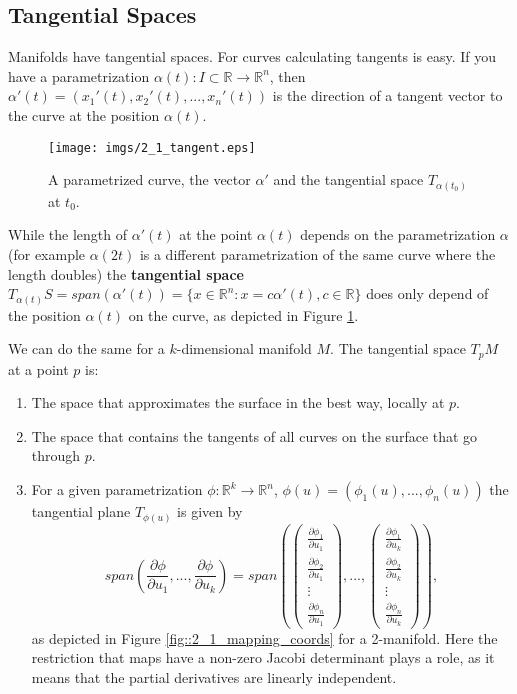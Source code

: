 	
\subsection{Tangential Spaces}		
Manifolds have tangential spaces.
For curves calculating tangents is easy. If you have a parametrization $\alpha(t): I \subset \mathbb R \to \mathbb R^n$, then $\alpha'(t) = (x_1'(t),x_2'(t),...,x_n'(t))$ is the direction of a tangent vector to the curve at the position $\alpha(t)$. 

\begin{figure}[tb]
\begin{center}
\texttt{[image: imgs/2\_1\_tangent.eps]}
\end{center}
\caption{A parametrized curve, the vector $\alpha'$ and the tangential space $T_{\alpha(t_0)}$ at $t_0$.}
\label{fig::2_1_paramCurve}
\end{figure}

		While the length of $\alpha'(t)$ at the point $\alpha(t)$ depends on the parametrization $\alpha$ (for example $\alpha(2t)$ is a different parametrization of the same curve where the length doubles) the \textbf{tangential space} $ T_{\alpha(t)}S = span(\alpha'(t)) = \{x \in \mathbb R^n: x = c \alpha'(t), c \in \mathbb R\}$ does only depend of the position $\alpha(t)$ on the curve, as depicted in Figure \ref{fig::2_1_paramCurve}. 
		
We can do the same for a $k$-dimensional manifold $M$. The tangential space $T_p M$ at a point $p$ is:

\begin{enumerate}
	\item The space that approximates the surface in the best way, locally at $p$.
	\item The space that contains the tangents of all curves on the surface that go through $p$.
	\item For a given parametrization $\phi: \mathbb R^k \to \mathbb R^n$, $\phi(u) = (\phi_1(u),...,\phi_n(u))$ the tangential plane $T_{\phi(u)}$ is given by
			\[span(\frac{\partial \phi} {\partial u_1},..., \frac{\partial \phi} {\partial u_k}) = span(\begin{pmatrix}
	\frac{\partial \phi_1} {\partial u_1} \\
	\frac{\partial \phi_2} {\partial u_1}\\
	\vdots\\
	\frac{\partial \phi_n} {\partial u_1}
\end{pmatrix},...,\begin{pmatrix}
	\frac{\partial \phi_1} {\partial u_k} \\
	\frac{\partial \phi_2} {\partial u_k}\\
	\vdots\\
	\frac{\partial \phi_n} {\partial u_k}
\end{pmatrix}),\]
as depicted in Figure \ref{fig::2_1_mapping_coords} for a 2-manifold. Here the restriction that maps have a non-zero Jacobi determinant plays a role, as it means that the partial derivatives are linearly independent.
\end{enumerate}

